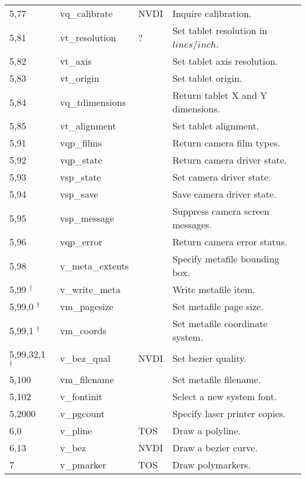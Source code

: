 \documentclass[a4paper]{article}
\begin{document}
\begin{supertabular}{|p{1.8cm}|p{3.0cm}|p{1.5cm}|p{8.7cm}|}
5,77            & vq\_calibrate       & NVDI  & Inquire calibration.\\
5,81            & vt\_resolution      & ?     & Set tablet resolution in $lines/inch$. \\
5,82            & vt\_axis            &       & Set tablet axis resolution. \\
5,83            & vt\_origin          &       & Set tablet origin. \\
5,84            & vq\_tdimensions     &       & Return tablet X and Y dimensions. \\
5,85            & vt\_alignment       &       & Set tablet alignment. \\
5,91            & vqp\_films          &       & Return camera film types. \\
5,92            & vqp\_state          &       & Return camera driver state. \\
5,93            & vsp\_state          &       & Set camera driver state. \\
5,94            & vsp\_save           &       & Save camera driver state. \\
5,95            & vsp\_message        &       & Suppress camera screen messages. \\
5,96            & vqp\_error          &       & Return camera error status. \\
5,98            & v\_meta\_extents    &       & Specify metafile bounding box. \\
5,99 $^\dag$    & v\_write\_meta      &       & Write metafile item. \\
5,99,0 $^\dag$  & vm\_pagesize        &       & Set metafile page size. \\
5,99,1 $^\dag$  & vm\_coords          &       & Set metafile coordinate system. \\
5,99,32,1 $^\dag$ & v\_bez\_qual      & NVDI  & Set bezier quality. \\
5,100           & vm\_filename        &       & Set metafile filename. \\
5,102           & v\_fontinit         &       & Select a new system font. \\
5,2000          & v\_pgcount          &       & Specify laser printer copies. \\
6,0             & v\_pline            & TOS   & Draw a polyline. \\
6,13            & v\_bez              & NVDI  & Draw a bezier curve. \\
7               & v\_pmarker          & TOS   & Draw polymarkers. \\

\end{supertabular}
\end{document}
